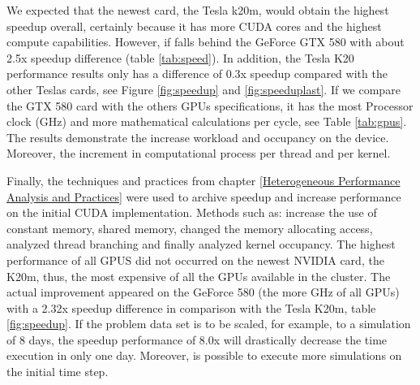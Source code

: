 We expected that the newest card, the Tesla k20m, would obtain the highest speedup overall, certainly because it has more CUDA cores and the highest compute capabilities. However, if falls behind the GeForce GTX 580 with about 2.5x speedup difference (table \ref{tab:speed}). In addition, the Tesla K20 performance results only has a difference of 0.3x speedup compared with the other Teslas cards, see Figure \ref{fig:speedup} and \ref{fig:speeduplast}. If we compare the GTX 580 card with the others GPUs specifications, it has the most Processor clock (GHz) and more mathematical calculations per cycle, see Table \ref{tab:gpus}. The results demonstrate the increase workload and occupancy on the device. Moreover, the increment in computational process per thread and per kernel.


  \vspace{4.0em}

Finally, the techniques and practices from chapter \ref{Heterogeneous Performance Analysis and Practices} were used to archive speedup and increase performance on the initial CUDA implementation. Methods such as: increase the use of constant memory, shared memory, changed the memory allocating access, analyzed thread branching and finally analyzed kernel occupancy. The highest performance of all GPUS did not occurred on the newest NVIDIA card, the K20m, thus, the most expensive of all the GPUs available in the cluster. The actual improvement appeared on the GeForce 580 (the more GHz of all GPUs) with a 2.32x speedup difference in comparison with the Tesla K20m, table \ref{fig:speedup}. If the problem data set is to be scaled, for example, to a simulation of 8 days, the speedup performance of 8.0x will drastically decrease the time execution in only one day. Moreover, is possible to execute more simulations on the initial time step.
  
